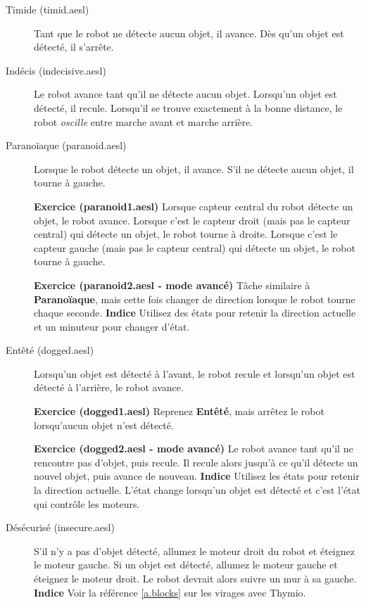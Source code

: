 
\begin{description}

\item[Timide (timid.aesl)] Tant que le robot ne détecte aucun objet, il avance. 
Dès qu'un objet est détecté, il s'arrête.

\item[Indécis (indecisive.aesl)] Le robot avance tant qu'il ne détecte aucun objet.
Lorsqu'un objet est détecté, il recule.
Lorsqu'il se trouve exactement à la bonne distance, le robot \emph{oscille}
entre marche avant et marche arrière.

\item[Paranoïaque (paranoid.aesl)] Lorsque le robot détecte un objet, il avance. S'il ne détecte
aucun objet, il tourne à gauche.

\textbf{Exercice (paranoid1.aesl)} 
Lorsque capteur central du robot détecte un objet, le robot avance.
Lorsque c'est le capteur droit (mais pas le capteur central) qui détecte un objet,
le robot tourne à droite.
Lorsque c'est le capteur gauche (mais pas le capteur central) qui détecte un objet,
le robot tourne à gauche.

\textbf{Exercice (paranoid2.aesl - mode avancé)} 
Tâche similaire à \textbf{Paranoïaque}, mais cette fois changer de direction lorsque le robot tourne
chaque seconde. \textbf{Indice} Utilisez des états pour retenir la direction actuelle
et un minuteur pour changer d'état.

\item[Entêté (dogged.aesl)] Lorsqu'un objet est détecté à l'avant, le robot recule et
lorsqu'un objet est détecté à l'arrière, le robot avance.

\textbf{Exercice (dogged1.aesl)}
Reprenez \textbf{Entêté}, mais arrêtez le robot lorsqu'aucun objet n'est détecté.

\textbf{Exercice (dogged2.aesl - mode avancé)}
Le robot avance tant qu'il ne rencontre pas d'objet, puis recule.
Il recule alors jusqu'à ce qu'il détecte un nouvel objet, puis avance de nouveau.
\textbf{Indice} Utilisez les états pour retenir la direction actuelle.
L'état change lorsqu'un objet est détecté et c'est l'état qui contrôle les moteurs.

\item[Désécurisé (insecure.aesl)]
S'il n'y a pas d'objet détecté, allumez le moteur droit du robot et éteignez le moteur gauche.
Si un objet est détecté, allumez le moteur gauche et éteignez le moteur droit.
Le robot devrait alors suivre un mur à sa gauche.
\textbf{Indice} Voir la référence \cref{a.blocks} sur les virages avec Thymio.


\end{description}
